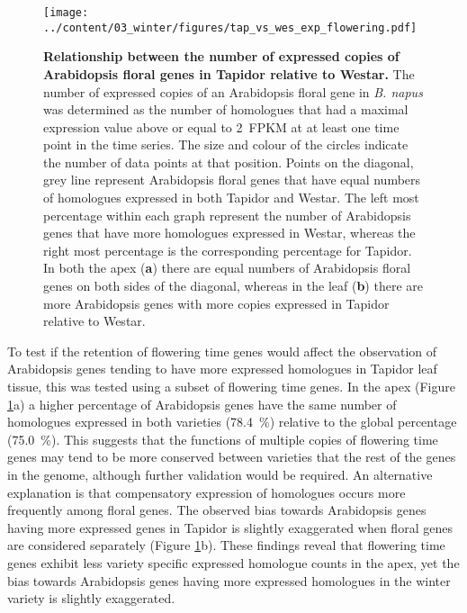 \documentclass[12pt,]{book}
\begin{document}
\begin{figure}[htbp]
\centering
\texttt{[image: ../content/03\_winter/figures/tap\_vs\_wes\_exp\_flowering.pdf]}
\caption{\textbf{Relationship between the number of expressed copies of
Arabidopsis floral genes in Tapidor relative to Westar.} The number of
expressed copies of an Arabidopsis floral gene in \emph{B. napus} was
determined as the number of homologues that had a maximal expression
value above or equal to 2~FPKM at at least one time point in the time
series. The size and colour of the circles indicate the number of data
points at that position. Points on the diagonal, grey line represent
Arabidopsis floral genes that have equal numbers of homologues expressed
in both Tapidor and Westar. The left most percentage within each graph
represent the number of Arabidopsis genes that have more homologues
expressed in Westar, whereas the right most percentage is the
corresponding percentage for Tapidor. In both the apex (\textbf{a})
there are equal numbers of Arabidopsis floral genes on both sides of the
diagonal, whereas in the leaf (\textbf{b}) there are more Arabidopsis
genes with more copies expressed in Tapidor relative to
Westar.}\label{figure:3xx:tapvswesflor}
\end{figure}

To test if the retention of flowering time genes would affect the
observation of Arabidopsis genes tending to have more expressed
homologues in Tapidor leaf tissue, this was tested using a subset of
flowering time genes. In the apex (Figure
\ref{figure:3xx:tapvswesflor}a) a higher percentage of Arabidopsis genes
have the same number of homologues expressed in both varieties (78.4~\%)
relative to the global percentage (75.0~\%). This suggests that the
functions of multiple copies of flowering time genes may tend to be more
conserved between varieties that the rest of the genes in the genome,
although further validation would be required. An alternative
explanation is that compensatory expression of homologues occurs more
frequently among floral genes. The observed bias towards Arabidopsis
genes having more expressed genes in Tapidor is slightly exaggerated
when floral genes are considered separately (Figure
\ref{figure:3xx:tapvswesflor}b). These findings reveal that flowering
time genes exhibit less variety specific expressed homologue counts in
the apex, yet the bias towards Arabidopsis genes having more expressed
homologues in the winter variety is slightly exaggerated.
\end{document}
